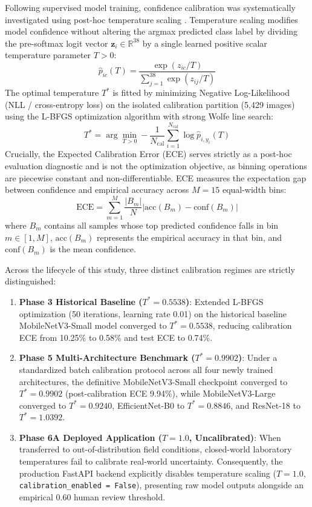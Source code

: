 \documentclass[pdflatex,sn-mathphys-num]{sn-jnl}
\theoremstyle{thmstyleone}%
\theoremstyle{thmstyletwo}%
\theoremstyle{thmstylethree}%
\begin{document}
Following supervised model training, confidence calibration was systematically investigated using post-hoc temperature scaling \citep{guo2017calibration}. Temperature scaling modifies model confidence without altering the argmax predicted class label by dividing the pre-softmax logit vector $\mathbf{z}_i \in \mathbb{R}^{38}$ by a single learned positive scalar temperature parameter $T > 0$:
\begin{equation}
  \hat{p}_{ic}(T) = \frac{\exp(z_{ic}/T)}{\sum_{j=1}^{38} \exp(z_{ij}/T)}
  \label{eq:temperature_scaling_prob}
\end{equation}
The optimal temperature $T^*$ is fitted by minimizing Negative Log-Likelihood (NLL / cross-entropy loss) on the isolated calibration partition (5{,}429 images) using the L-BFGS optimization algorithm with strong Wolfe line search:
\begin{equation}
  T^* = \arg\min_{T > 0} -\frac{1}{N_{\text{cal}}} \sum_{i=1}^{N_{\text{cal}}} \log \hat{p}_{i, y_i}(T)
  \label{eq:temperature_scaling}
\end{equation}
Crucially, the Expected Calibration Error (ECE) serves strictly as a post-hoc evaluation diagnostic and is not the optimization objective, as binning operations are piecewise constant and non-differentiable. ECE measures the expectation gap between confidence and empirical accuracy across $M=15$ equal-width bins:
\begin{equation}
  \text{ECE} = \sum_{m=1}^{M} \frac{|B_m|}{N}
  \left|\text{acc}(B_m) - \text{conf}(B_m)\right|
  \label{eq:ece}
\end{equation}
where $B_m$ contains all samples whose top predicted confidence falls in bin $m \in [1, M]$, $\text{acc}(B_m)$ represents the empirical accuracy in that bin, and $\text{conf}(B_m)$ is the mean confidence.

Across the lifecycle of this study, three distinct calibration regimes are strictly distinguished:
\begin{enumerate}
  \item \textbf{Phase 3 Historical Baseline ($T^* = 0.5538$)}: Extended L-BFGS optimization (50 iterations, learning rate 0.01) on the historical baseline MobileNetV3-Small model converged to $T^* = 0.5538$, reducing calibration ECE from 10.25\% to 0.58\% and test ECE to 0.74\%.
  \item \textbf{Phase 5 Multi-Architecture Benchmark ($T^* = 0.9902$)}: Under a standardized batch calibration protocol across all four newly trained architectures, the definitive MobileNetV3-Small checkpoint converged to $T^* = 0.9902$ (post-calibration ECE 9.94\%), while MobileNetV3-Large converged to $T^* = 0.9240$, EfficientNet-B0 to $T^* = 0.8846$, and ResNet-18 to $T^* = 1.0392$.
  \item \textbf{Phase 6A Deployed Application ($T = 1.0$, Uncalibrated)}: When transferred to out-of-distribution field conditions, closed-world laboratory temperatures fail to calibrate real-world uncertainty. Consequently, the production FastAPI backend explicitly disables temperature scaling ($T=1.0$, \texttt{calibration\_enabled = False}), presenting raw model outputs alongside an empirical 0.60 human review threshold.
\end{enumerate}
\end{document}
